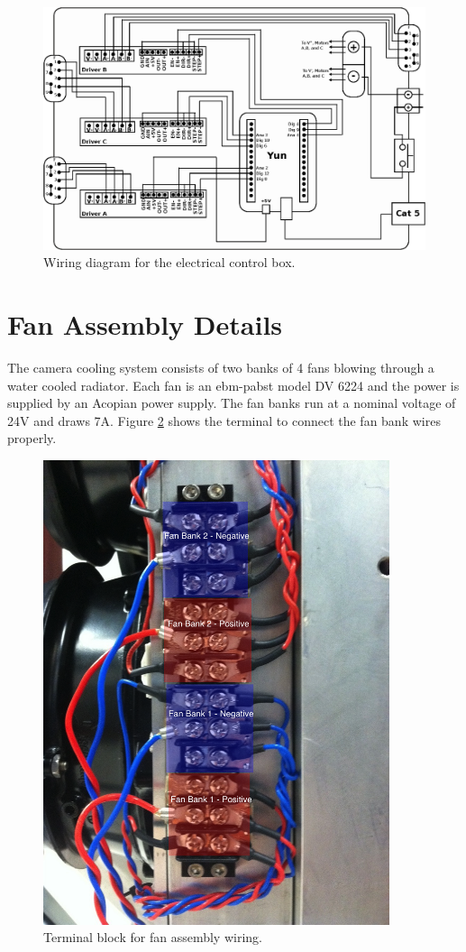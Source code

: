 \documentclass[11pt]{article}
\begin{document}
\begin{figure}[h]
\begin{center}
\includegraphics[width = 5.5in]{wiringDrawing.eps}
\caption{Wiring diagram for the electrical control box.}  
\label{fd2}
\end{center}
\end{figure}


\section{Fan Assembly Details}

The camera cooling system consists of two banks of 4 fans blowing through a water cooled radiator.
Each fan is an ebm-pabst model DV 6224 and the power is supplied by an Acopian power supply.
The fan banks run at a nominal voltage of 24V and draws 7A.
Figure \ref{fanPic} shows the terminal to connect the fan bank wires properly.


\begin{figure}[h]
\begin{center}
\includegraphics[width = 4in]{fanWiring.jpg}
\caption{Terminal block for fan assembly wiring.}  
\label{fanPic}
\end{center}
\end{figure}
\end{document}
